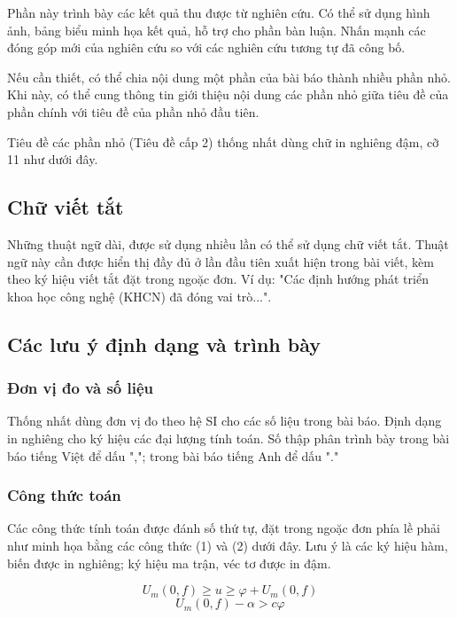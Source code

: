 Phần này trình bày các kết quả thu được từ nghiên cứu. Có thể sử dụng hình ảnh, bảng biểu minh họa kết quả, hỗ trợ cho phần bàn luận. Nhấn mạnh các đóng góp mới của nghiên cứu so với các nghiên cứu tương tự đã công bố.

Nếu cần thiết, có thể chia nội dung một phần của bài báo thành nhiều phần nhỏ. Khi này, có thể cung thông tin giới thiệu nội dung các phần nhỏ giữa tiêu đề của phần chính với tiêu đề của phần nhỏ đầu tiên. 

Tiêu đề các phần nhỏ (Tiêu đề cấp 2) thống nhất dùng chữ in nghiêng đậm, cỡ 11 như dưới đây.


\subsection{Chữ viết tắt}
\label{subsec:viet_tat}

Những thuật ngữ dài, được sử dụng nhiều lần có thể sử dụng chữ viết tắt. Thuật ngữ này cần được hiển thị đầy đủ ở lần đầu tiên xuất hiện trong bài viết, kèm theo ký hiệu viết tắt đặt trong ngoặc đơn. Ví dụ: "Các định hướng phát triển khoa học công nghệ (KHCN) đã đóng vai trò...".


\subsection{Các lưu ý định dạng và trình bày}
\label{subsec_Criterial}

\subsubsection{Đơn vị đo và số liệu}
Thống nhất dùng đơn vị đo theo hệ SI cho các số liệu trong bài báo. Định dạng in nghiêng cho ký hiệu các đại lượng tính toán. Số thập phân trình bày trong bài báo tiếng Việt để dấu ","; trong bài báo tiếng Anh để dấu "."


\subsubsection{Công thức toán}
Các công thức tính toán được đánh số thứ tự, đặt trong ngoặc đơn phía lề phải như minh họa bằng các công thức (1) và (2) dưới đây. Lưu ý là các ký hiệu hàm, biến được in nghiêng; ký hiệu ma trận, véc tơ được in đậm. 

\begin{equation}
	U_m(0,f) \geq u \geq \varphi + U_m(0,f)
\end{equation}
\begin{equation}
	U_m(0,f) - \alpha > c \varphi
\end{equation}

